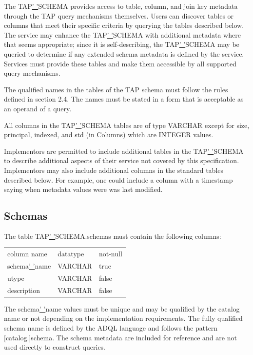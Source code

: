 \documentclass[11pt,letter]{ivoa}
\begin{document}
{The TAP\underline{' '}SCHEMA provides access to table, column, and join key 
metadata through the TAP query mechanisms themselves. Users can discover tables 
or columns that meet their specific criteria by querying the tables described 
below.  The service may enhance the TAP\underline{' '}SCHEMA with additional 
metadata where that seems appropriate; since it is self-describing, the 
TAP\underline{' '}SCHEMA may be queried to determine if any extended schema 
metadata is defined by the service. Services must provide these tables and make 
them accessible by all supported query mechanisms.

The qualified names in the tables of the TAP schema must follow the rules 
defined in section 2.4. The names must be stated in a form that is acceptable as 
an operand of a query.

All columns in the TAP\underline{' '}SCHEMA tables are of type VARCHAR except 
for size,  principal, indexed, and std (in Columns) which are INTEGER values.

Implementors are permitted to include additional tables in the 
TAP\underline{' '}SCHEMA to describe additional aspects of their service not 
covered by this specification. Implementors may also include additional columns 
in the standard tables described below. For example, one could include a column 
with a timestamp saying when metadata values were was last modified.

\subsection{Schemas}
\label{sec:tap-schema-schemas}

The table TAP\underline{' '}SCHEMA.schemas must contain the following columns:

\begin{tabular}{l l l}
\label{tab:resources}
column name & datatype & not-null \\
schema\underline{' '}name & VARCHAR & true \\
utype & VARCHAR & false \\
description & VARCHAR & false \\
\end{tabular}

The schema\underline{' '}name values must be unique and may be qualified by the 
catalog name or not depending on the implementation requirements. The fully 
qualified schema name is defined by the ADQL language and  follows the pattern 
[catalog.]schema. The schema metadata are included for reference and are not 
used directly to construct queries.

}
\end{document}
